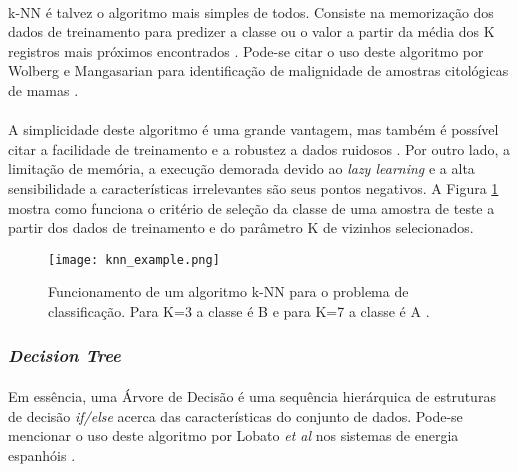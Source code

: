 \paragraph{} k-NN é talvez o algoritmo mais simples de todos. Consiste na memorização dos dados de treinamento para predizer a classe ou o valor a partir da média dos K registros mais próximos encontrados \cite{muller2016introduction, peterson2009k}. Pode-se citar o uso deste algoritmo por Wolberg e Mangasarian para identificação de malignidade de amostras citológicas de mamas \cite{wolberg1990multisurface}.

\paragraph{} A simplicidade deste algoritmo é uma grande vantagem, mas também é possível citar a facilidade de treinamento e a robustez a dados ruidosos \cite{bhatia2010survey}. Por outro lado, a limitação de memória, a execução demorada devido ao \textit{lazy learning} \cite{aha2013lazy} e a alta sensibilidade a características irrelevantes são seus pontos negativos. A Figura \ref{fig:8} mostra como funciona o critério de seleção da classe de uma amostra de teste a partir dos dados de treinamento e do parâmetro K de vizinhos selecionados.

\begin{figure}[h]
    \texttt{[image: knn\_example.png]}
    \centering
    \caption{Funcionamento de um algoritmo k-NN para o problema de classificação. Para K=3 a classe é B e para K=7 a classe é A \cite{knn_classification}.}
    \label{fig:8}
\end{figure}


\FloatBarrier
\subsubsection*{\textit{Decision Tree}}

\paragraph{} Em essência, uma Árvore de Decisão é uma sequência hierárquica de estruturas de decisão \textit{if/else} acerca das características do conjunto de dados. Pode-se mencionar o uso deste algoritmo por Lobato \textit{et al} nos sistemas de energia espanhóis \cite{lobato2006decision}.

